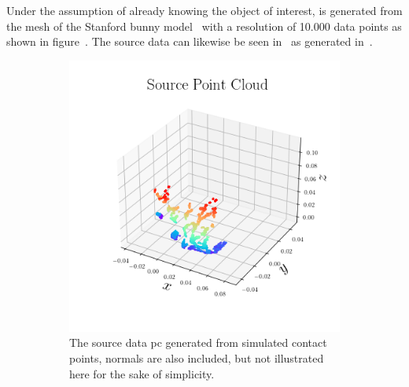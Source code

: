Under the assumption of already knowing the object of interest,  is generated from the mesh of the Stanford bunny model~\cite{stanford-bunny} with a resolution of \num{10,000} data points as shown in figure~. The source data  can likewise be seen in~ as generated in~. \medskip

\begin{figure}[!h]
	\centering
	\begin{subfigure}[b]{0.48\textwidth}
		\centering
		\includegraphics[width=\textwidth]{chapters/1-tactile-perception/fig/matplotlib/pc_source.png}
		\caption{The source data  \gls{pc} generated from simulated contact points, normals are also included, but not illustrated here for the sake of simplicity.}
		\label{fig:pe-pc-source}
	\end{subfigure}
	\hfill
	\begin{subfigure}[b]{0.48\textwidth}
		\centering

\end{subfigure}
\end{figure}
